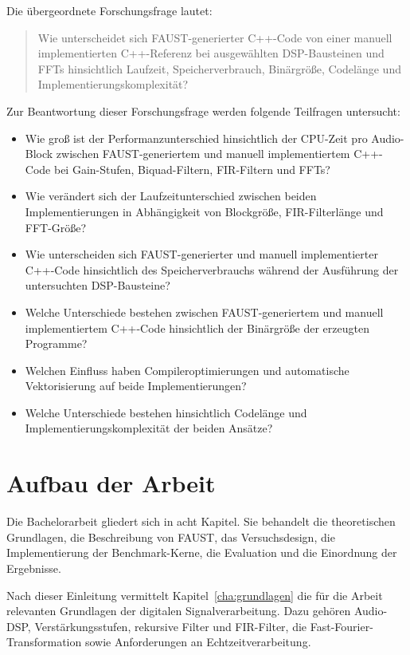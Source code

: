 Die übergeordnete Forschungsfrage lautet:
\begin{quote}
	Wie unterscheidet sich FAUST-generierter C++-Code von einer manuell
	implementierten C++-Referenz bei ausgewählten DSP-Bausteinen und FFTs
	hinsichtlich Laufzeit, Speicherverbrauch, Binärgröße, Codelänge und
	Implementierungskomplexität?
\end{quote}

Zur Beantwortung dieser Forschungsfrage werden folgende Teilfragen untersucht:

\begin{itemize}
	\item Wie groß ist der Performanzunterschied hinsichtlich der CPU-Zeit pro Audio-Block zwischen FAUST-generiertem und manuell implementiertem C++-Code bei Gain-Stufen, Biquad-Filtern, FIR-Filtern und FFTs?
	\item Wie verändert sich der Laufzeitunterschied zwischen beiden
	Implementierungen in Abhängigkeit von Blockgröße, FIR-Filterlänge
	und FFT-Größe?
	\item Wie unterscheiden sich FAUST-generierter und manuell implementierter C++-Code hinsichtlich des Speicherverbrauchs während der Ausführung der untersuchten DSP-Bausteine?
	\item Welche Unterschiede bestehen zwischen FAUST-generiertem und manuell implementiertem C++-Code hinsichtlich der Binärgröße der erzeugten Programme?
	\item Welchen Einfluss haben Compileroptimierungen und automatische Vektorisierung auf beide Implementierungen?
	\item Welche Unterschiede bestehen hinsichtlich Codelänge und Implementierungskomplexität der beiden Ansätze?
\end{itemize}


\section{Aufbau der Arbeit}
Die Bachelorarbeit gliedert sich in acht Kapitel. Sie behandelt die theoretischen Grundlagen, die Beschreibung von FAUST, das Versuchsdesign, die Implementierung der Benchmark-Kerne, die Evaluation und die Einordnung der Ergebnisse.

Nach dieser Einleitung vermittelt Kapitel~\ref{cha:grundlagen} die für die Arbeit relevanten Grundlagen der digitalen Signalverarbeitung. Dazu gehören Audio-DSP, Verstärkungsstufen, rekursive Filter und FIR-Filter, die Fast-Fourier-Transformation sowie Anforderungen an Echtzeitverarbeitung.

